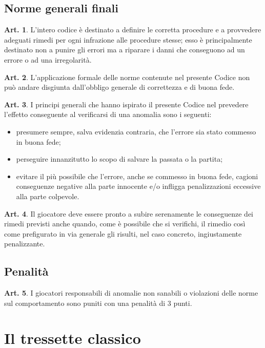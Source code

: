 \documentclass[italian,a4paper]{book}
\theoremstyle{definition}
\newtheorem{art}{Art.}
\newenvironment{packeditem}{
\begin{itemize}
  \setlength{\itemsep}{1pt}
  \setlength{\parskip}{0pt}
  \setlength{\parsep}{0pt}
}{\end{itemize}}
\begin{document}
\section{Norme generali finali}
\begin{art}
    L'intero codice è destinato a definire le corretta procedure e a provvedere adeguati rimedi per ogni infrazione alle procedure stesse; esso è principalmente destinato non a punire gli errori ma a riparare i danni che conseguono ad un errore o ad una irregolarità.
\end{art}
\begin{art}
    L'applicazione formale delle norme contenute nel presente Codice non può andare disgiunta dall'obbligo generale di correttezza e di buona fede.
\end{art}
\begin{art}
    I principi generali che hanno ispirato il presente Codice nel prevedere l'effetto conseguente al verificarsi di una anomalia sono i seguenti:
    \begin{packeditem}
\item  presumere sempre, salva evidenzia contraria, che l'errore sia stato commesso in buona fede;
\item  perseguire innanzitutto lo scopo di salvare la passata o la partita;
\item  evitare il più possibile che l'errore, anche se commesso in buona fede, cagioni conseguenze negative alla parte innocente e/o infligga  penalizzazioni eccessive alla parte colpevole.
    \end{packeditem}
\end{art}
\begin{art}
    Il giocatore deve essere pronto a subire serenamente le conseguenze dei rimedi previsti anche quando, come è possibile che si verifichi, il rimedio così come prefigurato in via generale gli risulti, nel caso concreto, ingiustamente penalizzante.
\end{art}
\section{Penalità}
\begin{art}
    I giocatori responsabili di anomalie non sanabili o violazioni delle norme sul
    comportamento sono puniti con una penalità di 3 punti.
\end{art}
\chapter{Il tressette classico}
\end{document}
